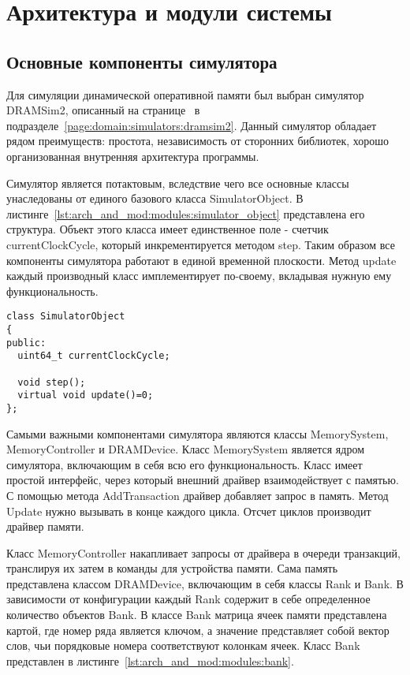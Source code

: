\section{Архитектура и модули системы} %
\label{sec:arch_and_mod}


\subsection{Основные компоненты симулятора}
\label{sub:arch_and_mod:modules}

Для симуляции динамической оперативной памяти был выбран симулятор DRAMSim2, описанный на странице~\pageref{page:domain:simulators:dramsim2} в подразделе~\ref{page:domain:simulators:dramsim2}. Данный симулятор обладает рядом преимуществ: простота, независимость от сторонних библиотек, хорошо организованная внутренняя архитектура программы. 

Симулятор является потактовым, вследствие чего все основные классы унаследованы от единого базового класса SimulatorObject. В листинге~\ref{lst:arch_and_mod:modules:simulator_object} представлена его структура. Объект этого класса имеет единственное поле - счетчик currentClockCycle, который инкрементируется методом step. Таким образом все компоненты симулятора работают в единой временной плоскости. Метод update каждый производный класс имплементирует по-своему, вкладывая нужную ему функциональность.  

\begin{lstlisting}[style=cplusplusstyle, caption={Класс SimulatorObject}, label=lst:arch_and_mod:modules:simulator_object]
class SimulatorObject
{
public:
  uint64_t currentClockCycle;

  void step();
  virtual void update()=0;
};
\end{lstlisting}

Самыми важными компонентами симулятора являются классы MemorySystem, MemoryController и DRAMDevice. 
Класс MemorySystem является ядром симулятора, включающим в себя всю его функциональность. Класс имеет простой интерфейс, через который внешний драйвер взаимодействует с памятью. С помощью метода AddTransaction драйвер добавляет запрос в память. Метод Update нужно вызывать в конце каждого цикла. Отсчет циклов производит драйвер памяти. 

Класс MemoryController  накапливает запросы от драйвера в очереди транзакций, транслируя их затем в команды для устройства памяти.  
Сама память представлена классом DRAMDevice, включающим в себя классы Rank и Bank. В зависимости от конфигурации каждый Rank содержит в себе определенное количество объектов Bank. В классе Bank матрица ячеек памяти представлена картой, где номер ряда является ключом, а значение представляет собой вектор слов, чьи порядковые номера соответствуют колонкам ячеек. Класс Bank представлен в листинге~\ref{lst:arch_and_mod:modules:bank}.


